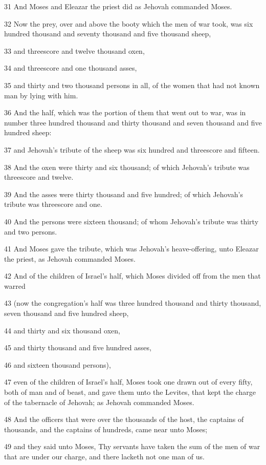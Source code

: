 \par 31 And Moses and Eleazar the priest did as Jehovah commanded Moses.
\par 32 Now the prey, over and above the booty which the men of war took, was six hundred thousand and seventy thousand and five thousand sheep,
\par 33 and threescore and twelve thousand oxen,
\par 34 and threescore and one thousand asses,
\par 35 and thirty and two thousand persons in all, of the women that had not known man by lying with him.
\par 36 And the half, which was the portion of them that went out to war, was in number three hundred thousand and thirty thousand and seven thousand and five hundred sheep:
\par 37 and Jehovah's tribute of the sheep was six hundred and threescore and fifteen.
\par 38 And the oxen were thirty and six thousand; of which Jehovah's tribute was threescore and twelve.
\par 39 And the asses were thirty thousand and five hundred; of which Jehovah's tribute was threescore and one.
\par 40 And the persons were sixteen thousand; of whom Jehovah's tribute was thirty and two persons.
\par 41 And Moses gave the tribute, which was Jehovah's heave-offering, unto Eleazar the priest, as Jehovah commanded Moses.
\par 42 And of the children of Israel's half, which Moses divided off from the men that warred
\par 43 (now the congregation's half was three hundred thousand and thirty thousand, seven thousand and five hundred sheep,
\par 44 and thirty and six thousand oxen,
\par 45 and thirty thousand and five hundred asses,
\par 46 and sixteen thousand persons),
\par 47 even of the children of Israel's half, Moses took one drawn out of every fifty, both of man and of beast, and gave them unto the Levites, that kept the charge of the tabernacle of Jehovah; as Jehovah commanded Moses.
\par 48 And the officers that were over the thousands of the host, the captains of thousands, and the captains of hundreds, came near unto Moses;
\par 49 and they said unto Moses, Thy servants have taken the sum of the men of war that are under our charge, and there lacketh not one man of us.
